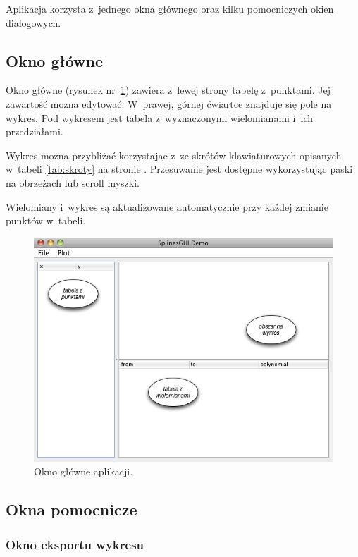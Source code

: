\documentclass[10pt,a4paper]{article}
\begin{document}
Aplikacja korzysta z~jednego okna głównego oraz kilku pomocniczych okien
dialogowych.

\subsection{Okno główne}

Okno główne (rysunek nr~\ref{fig:okno-glowne}) zawiera z~lewej strony
tabelę z~punktami. Jej zawartość można edytować. W~prawej, górnej ćwiartce
znajduje się pole na wykres. Pod wykresem jest tabela z~wyznaczonymi
wielomianami i~ich przedziałami.

Wykres można przybliżać korzystając z~ze skrótów klawiaturowych opisanych
w~tabeli \ref{tab:skroty} na stronie \pageref{tab:skroty}. Przesuwanie jest
dostępne wykorzystując paski na obrzeżach lub scroll myszki.

Wielomiany i~wykres są aktualizowane automatycznie przy każdej zmianie punktów
w~tabeli.

\begin{figure}[hb]
  \centering
  \includegraphics[width=\textwidth]{images/okno-glowne}
  \caption{Okno główne aplikacji.}
  \label{fig:okno-glowne}
\end{figure}

\subsection{Okna pomocnicze}

\subsubsection{Okno eksportu wykresu}
\end{document}
